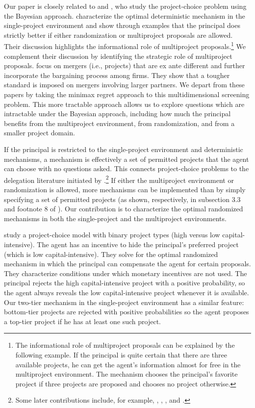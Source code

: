 \documentclass[12pt,english]{article}
\theoremstyle{remark}
\theoremstyle{plain}
\theoremstyle{definition}
\begin{document}
Our paper is closely related to \cite{ArmstrongVickers2010} and \cite{NockeWhinston}, who study the project-choice problem using the Bayesian approach. \cite{ArmstrongVickers2010} characterize the optimal deterministic mechanism in the single-project environment and show through examples that the principal does strictly better if either randomization or multiproject proposals are allowed. Their discussion highlights the informational role of multiproject proposals.\footnote{The informational role of multiproject proposals can be explained by the following example. If the principal is quite certain that there are three available projects, he can get the agent's information almost for free in the multiproject environment. The mechanism chooses the principal's favorite project if three projects are proposed and chooses no project otherwise.} We complement their discussion by identifying the strategic role of multiproject proposals. \cite{NockeWhinston} focus on mergers (i.e., projects) that are ex ante different and further incorporate the bargaining process among firms. They show that a tougher standard is imposed on mergers involving larger partners. We depart from these papers by taking the minimax regret approach to this multidimensional screening problem. This more tractable approach allows us to explore questions which are intractable under the Bayesian approach, including how much the principal benefits from the multiproject environment, from randomization, and from a smaller project domain. 

If the principal is restricted to the single-project environment and deterministic mechanisms, a mechanism is effectively a set of permitted projects that the agent can choose with no questions asked. This connects project-choice problems to the delegation literature initiated by \cite{Holmstrom1984}.\footnote{Some later contributions include, for example, \cite{MelumadShibano1991}, \cite{MartimortSemenov2006}, \cite{AlonsoMatouschek2008}, and \cite{AmadorBagwell2013}.} If either the multiproject environment or randomization is allowed, more mechanisms can be implemented than by simply specifying a set of permitted projects (as shown, respectively, in subsection 3.3 and footnote 8 of \cite{ArmstrongVickers2010}). Our contribution is to characterize the optimal randomized mechanisms in both the single-project and the multiproject environments. 



\cite{BerkovitchIsrael2004} study a project-choice model with binary project types (high versus low capital-intensive). The agent has an incentive to hide the principal's preferred project (which is low capital-intensive). They solve for the optimal randomized mechanism in which the principal can compensate the agent for certain proposals. They characterize conditions under which monetary incentives are not used. The principal rejects the high capital-intensive project with a positive probability, so the agent always reveals the low capital-intensive project whenever it is available. Our two-tier mechanism in the single-project environment has a similar feature: bottom-tier projects are rejected with positive probabilities so the agent proposes a top-tier project if he has at least one such project. 
 
\end{document}
